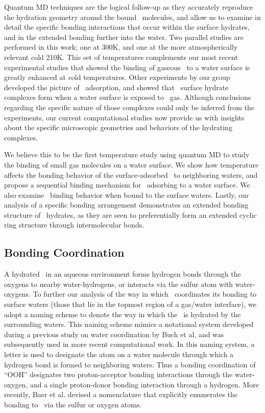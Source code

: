 \documentclass{article}
\begin{document}
Quantum MD techniques are the logical follow-up as they accurately reproduce the hydration geometry around the bound \suldiox~molecules, and allow us to examine in detail the specific bonding interactions that occur within the surface hydrates, and in the extended bonding further into the water.\cite{Baer2010} Two parallel studies are performed in this work; one at 300K, and one at the more atmospherically relevant cold 210K. This set of temperatures complements our most recent experimental studies that showed the binding of gaseous \suldiox~to a water surface is greatly enhanced at cold temperatures.\cite{Ota2011} Other experiments by our group developed the picture of \suldiox~adsorption, and showed that \suldiox~surface hydrate complexes form when a water surface is exposed to \suldiox~gas.\cite{Tarbuck2005,Tarbuck2006} Although conclusions regarding the specific nature of those complexes could only be inferred from the experiments, our current computational studies now provide us with insights about the specific microscopic geometries and behaviors of the hydrating complexes.

We believe this to be the first temperature study using quantum MD to study the binding of small gas molecules on a water surface. We show how temperature affects the bonding behavior of the surface-adsorbed \suldiox~to neighboring waters, and propose a sequential binding mechanism for \suldiox~adsorbing to a water surface. We also examine \suldiox~binding behavior when bound to the surface waters. Lastly, our analysis of a specific bonding arrangement demonstrates an extended bonding structure of \suldiox~hydrates, as they are seen to preferentially form an extended cyclic ring structure through intermolecular bonds.


\subsection {Bonding Coordination}

A hydrated \suldiox~in an aqueous environment forms hydrogen bonds through the oxygens to nearby water-hydrogens, or interacts via the sulfur atom with water-oxygens.\cite{Baer2010,Bishenden1998,Steudel2009} To further our analysis of the way in which \suldiox~coordinates its bonding to surface waters (those that lie in the topmost region of a gas/water interface), we adopt a naming scheme to denote the way in which the \suldiox~is hydrated by the surrounding waters. This naming scheme mimics a notational system developed during a previous study on water coordination by Buch et al,\cite{Buch 2005} and was subsequently used in more recent computational work.\cite{Walker2006b} In this naming system, a letter is used to designate the atom on a water molecule through which a hydrogen bond is formed to neighboring waters. Thus a bonding coordination of ``OOH'' designates two proton-acceptor bonding interactions through the water-oxygen, and a single proton-donor bonding interaction through a hydrogen. More recently, Baer et al. devised a nomenclature that explicitly enumerates the bonding to \suldiox~via the sulfur or oxygen atoms.\cite{Baer2010} 
\end{document}
